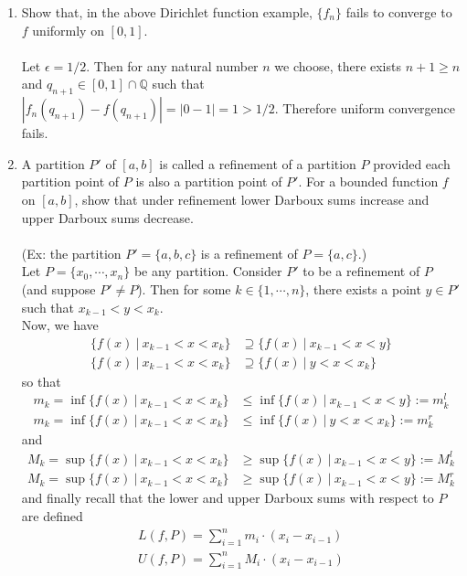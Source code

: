 \begin{enumerate}
	\setcounter{enumi}{0}
    \item Show that, in the above Dirichlet function example, $\{f_n\}$ fails to converge to $f$ uniformly on $[0,1]$.\\
    \\Let $\epsilon=1/2$. Then for any natural number $n$ we choose, there exists $n+1\ge n$ and $q_{n+1}\in[0,1]\cap\mathbb{Q}$ such that $|f_n(q_{n+1})-f(q_{n+1})|=|0-1|=1>1/2$.
    Therefore uniform convergence fails.
    \item A partition $P'$ of $[a,b]$ is called a refinement of a partition $P$ provided each partition point of $P$ is also a partition point of $P'$.
    For a bounded function $f$ on $[a,b]$, show that under refinement lower Darboux sums increase and upper Darboux sums decrease.\\
    \\(Ex: the partition $P'=\{a,b,c\}$ is a refinement of $P=\{a,c\}$.)
    \\Let $P=\{x_0,\cdots,x_n\}$ be any partition.
    Consider $P'$ to be a refinement of $P$ (and suppose $P'\neq P$). 
    Then for some $k\in\{1,\cdots,n\}$, there exists a point $y\in P'$ such that $x_{k-1}<y<x_k$.
    \\Now, we have 
    \begin{align*}
        \{f(x)\ |\ x_{k-1}<x<x_k\}&\supseteq\{f(x)\ |\ x_{k-1}<x<y\}\\
        \{f(x)\ |\ x_{k-1}<x<x_k\}&\supseteq\{f(x)\ |\ y<x<x_k\}
    \end{align*}
    so that
    \begin{align*}
        m_k=\inf\{f(x)\ |\ x_{k-1}<x<x_k\}&\le \inf\{f(x)\ |\ x_{k-1}<x<y\}:=m_k^l\\
        m_k=\inf\{f(x)\ |\ x_{k-1}<x<x_k\}&\le \inf\{f(x)\ |\ y<x<x_k\}:=m_k^r
    \end{align*}
    and 
    \begin{align*}
        M_k=\sup\{f(x)\ |\ x_{k-1}<x<x_k\}&\ge \sup\{f(x)\ |\ x_{k-1}<x<y\}:=M_k^l\\
        M_k=\sup\{f(x)\ |\ x_{k-1}<x<x_k\}&\ge \sup\{f(x)\ |\ x_{k-1}<x<y\}:=M_k^r
    \end{align*}
    and finally recall that the lower and upper Darboux sums with respect to $P$ are defined
    \begin{align*}
        L(f,P)=\sum_{i=1}^n m_i\cdot (x_i-x_{i-1})\\
        U(f,P)=\sum_{i=1}^n M_i\cdot (x_i-x_{i-1})
    \end{align*}

\end{enumerate}
